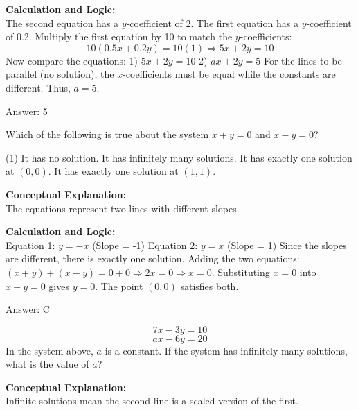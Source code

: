 \documentclass[11pt,paper=a4,answers]{exam}
\begin{document}
\begin{questions}
\begin{solution}
\vspace{10pt}
\textbf{Calculation and Logic:} \\
The second equation has a $y$-coefficient of 2. The first equation has a $y$-coefficient of 0.2.
Multiply the first equation by 10 to match the $y$-coefficients:
\[ 10(0.5x + 0.2y) = 10(1) \Rightarrow 5x + 2y = 10 \]
Now compare the equations:
1) $5x + 2y = 10$
2) $ax + 2y = 5$
For the lines to be parallel (no solution), the $x$-coefficients must be equal while the constants are different. Thus, $a = 5$.

\vspace{15pt}
Answer: \colorbox{yellow!100}{5}
\end{solution}

\question
Which of the following is true about the system $x + y = 0$ and $x - y = 0$?
\begin{tasks}(1)
    \task It has no solution.
    \task It has infinitely many solutions.
    \task It has exactly one solution at $(0,0)$.
    \task It has exactly one solution at $(1,1)$.
\end{tasks}

\begin{solution}
\textbf{Conceptual Explanation:} \\
The equations represent two lines with different slopes.

\vspace{10pt}
\textbf{Calculation and Logic:} \\
Equation 1: $y = -x$ (Slope = -1)
Equation 2: $y = x$ (Slope = 1)
Since the slopes are different, there is exactly one solution.
Adding the two equations: $(x+y) + (x-y) = 0 + 0 \Rightarrow 2x = 0 \Rightarrow x = 0$.
Substituting $x=0$ into $x+y=0$ gives $y=0$.
The point $(0,0)$ satisfies both.

\vspace{15pt}
Answer: \colorbox{yellow!100}{C}
\end{solution}

\question
\[ 7x - 3y = 10 \]
\[ ax - 6y = 20 \]
In the system above, $a$ is a constant. If the system has infinitely many solutions, what is the value of $a$?

\begin{solution}
\textbf{Conceptual Explanation:} \\
Infinite solutions mean the second line is a scaled version of the first.


\end{solution}
\end{questions}
\end{document}
